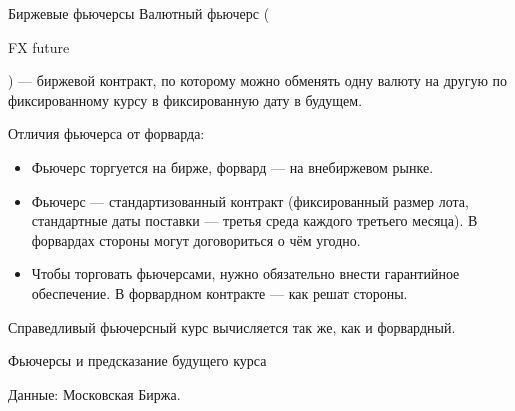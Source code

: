 \documentclass{beamer}
\newcommand{\en}[1]{\begin{otherlanguage}{english}#1\end{otherlanguage}}
\begin{document}
\begin{frame}{Биржевые фьючерсы}
\justify
\alert{Валютный фьючерс} (\en{FX future}) --- биржевой контракт, по которому можно обменять одну валюту на другую по фиксированному курсу в фиксированную дату в будущем.

\justify
Отличия фьючерса от форварда:
\begin{itemize}
\justifying
\item Фьючерс торгуется на бирже, форвард --- на внебиржевом рынке.
\item Фьючерс --- стандартизованный контракт (фиксированный размер лота, стандартные даты поставки --- третья среда каждого третьего месяца). В форвардах стороны могут договориться о чём угодно.
\item Чтобы торговать фьючерсами, нужно обязательно внести гарантийное обеспечение. В форвардном контракте --- как решат стороны.
\end{itemize}

\justify
Справедливый фьючерсный курс вычисляется так же, как и форвардный.
\end{frame}



\begin{frame}{Фьючерсы и предсказание будущего курса}
\center
{}

\scriptsize Данные: Московская Биржа.
\end{frame}
\end{document}
